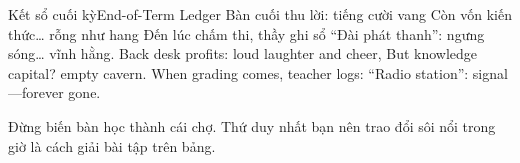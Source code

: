 \begin{tutuyetbox}{Kết sổ cuối kỳ}{End-of-Term Ledger}
Bàn cuối thu lời: tiếng cười vang
Còn vốn kiến thức… rỗng như hang
Đến lúc chấm thi, thầy ghi sổ
“Đài phát thanh”: ngưng sóng… vĩnh hằng.
\tcblower
Back desk profits: loud laughter and cheer,
But knowledge capital? empty cavern.
When grading comes, teacher logs:
“Radio station”: signal—forever gone.
\end{tutuyetbox}

\begin{ghichu}
Đừng biến bàn học thành cái chợ. Thứ duy nhất bạn nên trao đổi sôi nổi trong giờ là cách giải bài tập trên bảng.
\end{ghichu}